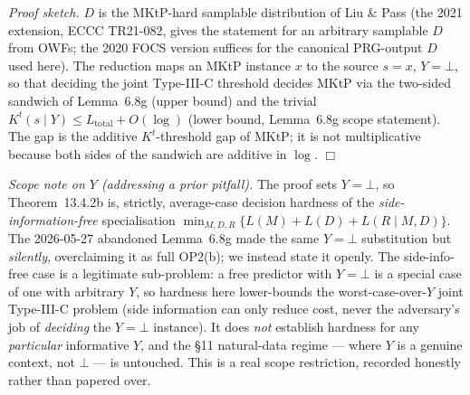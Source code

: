 \documentclass[
]{article}
\begin{document}
\emph{Proof sketch.} $D$ is the MKtP-hard samplable distribution of Liu
\& Pass (the 2021 extension, ECCC TR21-082, gives the statement for an
arbitrary samplable $D$ from OWFs; the 2020 FOCS version suffices for
the canonical PRG-output $D$ used here). The reduction maps an MKtP
instance $x$ to the source $s=x$, $Y=\bot$, so that deciding the joint
Type-III-C threshold decides MKtP via the two-sided sandwich of
Lemma~6.8g (upper bound) and the trivial $K^t(s\mid Y)\le
L_{\mathrm{total}}+O(\log)$ (lower bound, Lemma~6.8g scope statement).
The gap is the additive $K^t$-threshold gap of MKtP; it is not
multiplicative because both sides of the sandwich are additive in
$\log$. $\Box$

\emph{Scope note on $Y$ (addressing a prior pitfall).} The proof sets
$Y=\bot$, so Theorem~13.4.2b is, strictly, average-case decision
hardness of the \emph{side-information-free} specialisation
$\min_{M,D,R}\{L(M)+L(D)+L(R\mid M,D)\}$. The 2026-05-27 abandoned
Lemma~6.8g made the same $Y=\bot$ substitution but \emph{silently},
overclaiming it as full OP2(b); we instead state it openly. The
side-info-free case is a legitimate sub-problem: a free predictor with
$Y=\bot$ is a special case of one with arbitrary $Y$, so hardness here
lower-bounds the worst-case-over-$Y$ joint Type-III-C problem (side
information can only reduce cost, never the adversary's job of \emph{deciding}
the $Y=\bot$ instance). It does \emph{not} establish hardness for any
\emph{particular} informative $Y$, and the §11 natural-data regime ---
where $Y$ is a genuine context, not $\bot$ --- is untouched. This is a
real scope restriction, recorded honestly rather than papered over.
\end{document}
